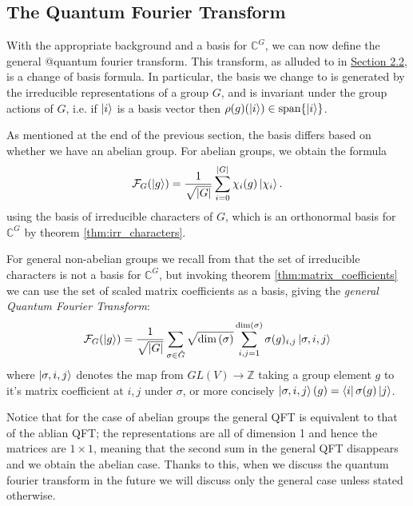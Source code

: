 \documentclass{article}
\renewcommand{\bra}{\Bra}
\renewcommand{\ket}{\Ket}
\theoremstyle{plain}
\theoremstyle{centered}
\renewcommand{\bra}{\Bra}
\renewcommand{\ket}{\Ket}
\newcommand{\abs}[1]{\left\lvert #1 \right\rvert}
\renewcommand{\dim}[1]{\textnormal{dim}\left(#1\right)}
\newcommand{\bb}[1]{\mathbb{#1}}
\renewcommand{\cal}[1]{\mathcal{#1}}
\begin{document}
    \subsection{The Quantum Fourier Transform}\label{history:QFT}

        With the appropriate background and a basis for $\bb{C}^G$, we can now define the general @quantum fourier transform.
        This transform, as alluded to in \hyperref[history:representation_theory]{Section 2.2}, is a change of basis formula.
        In particular, the basis we change to is generated by the irreducible representations of a group $G$, and is invariant under the group actions of $G$, i.e. if $\ket{i}$ is a basis vector then $\rho(g)(\ket{i}) \in \textnormal{span}\{\ket{i}\}$.
        
        As mentioned at the end of the previous section, the basis differs based on whether we have an abelian group.
        For abelian groups, we obtain the formula
        \begin{equation}\label{def:abelian_QFT}
            \cal{F}_G(\ket{g}) = \frac{1}{\sqrt{\abs{G}}} \sum_{i=0}^{\abs{G}} \chi_i(g) \ket{\chi_i}.
        \end{equation}
        using the basis of irreducible characters of $G$, which is an orthonormal basis for $\bb{C}^G$ by theorem \ref{thm:irr_characters}.

        For general non-abelian groups we recall from that the set of irreducible characters is not a basis for $\bb{C}^G$, but invoking theorem \ref{thm:matrix_coefficients} we can use the set of scaled matrix coefficients as a basis, giving the \textit{general Quantum Fourier Transform}:
        \begin{equation}\label{def:general_QFT}
        \cal{F}_G(\ket{g}) = \frac{1}{\sqrt{\abs{G}}} \sum_{\sigma \in \hat{G}} \sqrt{\dim{\sigma}} \sum_{i,j = 1}^{\dim{\sigma}} \sigma(g)_{i,j} \ket{\sigma, i, j}
        \end{equation}
        where $\ket{\sigma, i, j}$ denotes the map from $GL(V) \to \bb{Z}$ taking a group element $g$ to it's matrix coefficient at $i, j$ under $\sigma$, or more concisely $\ket{\sigma, i, j}(g) = \bra{i}\sigma(g) \ket{j}$.

        Notice that for the case of abelian groups the general QFT is equivalent to that of the ablian QFT; the representations are all of dimension 1 and hence the matrices are $1 \times 1$, meaning that the second sum in the general QFT disappears and we obtain the abelian case.
        Thanks to this, when we discuss the quantum fourier transform in the future we will discuss only the general case unless stated otherwise.
\end{document}
